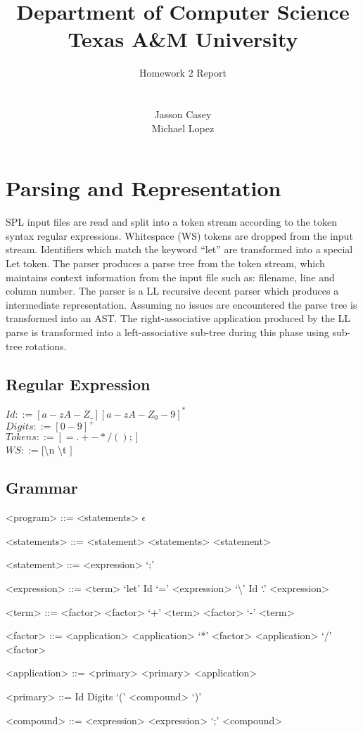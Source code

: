 \documentclass{article}
\title{
Department of Computer Science \\Texas A\&M University}
\author{\LARGE Homework 2 Report\\ \\
\\Jasson Casey
\\Michael Lopez }
\begin{document}
\maketitle

\section{Parsing and Representation}

SPL input files are read and split into a token stream according to the token
syntax regular expressions. Whitespace (WS) tokens are dropped from the input
stream. Identifiers which match the keyword ``let'' are transformed into a 
special Let token. The parser produces a parse tree from the token stream,
which maintains context information from the input file such as: filename, line
and column number. The parser is a LL recursive decent parser which produces a 
intermediate representation. Assuming no issues are encountered the parse
tree is transformed into an AST. The right-associative application produced by
the LL parse is transformed into a left-associative sub-tree during this phase
using sub-tree rotations.

\subsection{Regular Expression}

$Id ::= [a-zA-Z\_][a-zA-Z_0-9]^{*}$\\
$Digits ::= [0-9]^{+}$\\
$Tokens ::= [=.+-*/();]$\\
$WS ::= [$\textbackslash n \textbackslash t $]$

\subsection{Grammar}

\begin{grammar}
<program> ::= <statements>
   \alt $\epsilon$ 

<statements> ::= <statement> <statements>
   \alt <statement>

<statement> ::= <expression> `;'
              
<expression> ::= <term>
   \alt `let' Id `=' <expression>
   \alt `\textbackslash' Id `.' <expression>

<term> ::= <factor>
   \alt <factor> `+' <term>
   \alt <factor> `-' <term>

<factor> ::= <application>
   \alt <application> `*' <factor>
   \alt <application> `/' <factor>

<application> ::= <primary>
   \alt <primary> <application>

<primary> ::= Id
   \alt Digits
   \alt `(' <compound> `)'

<compound> ::= <expression>
   \alt <expression> `;' <compound>
\end{grammar}
\end{document}

